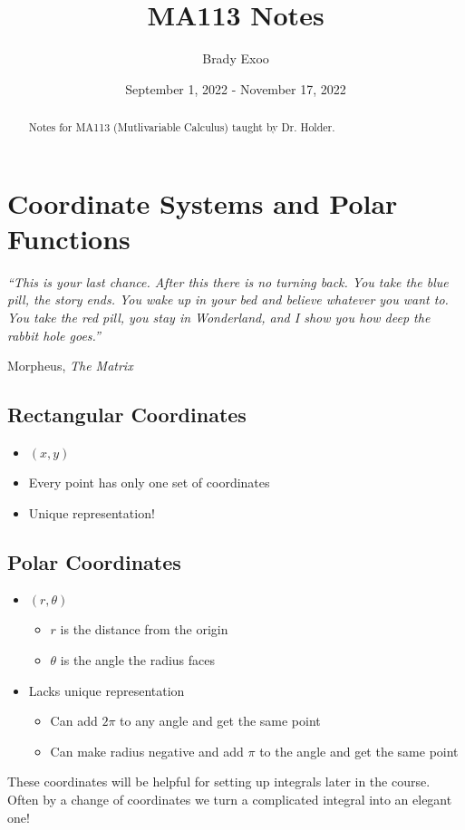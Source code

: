 \documentclass[12pt]{article}
\theoremstyle{plain} %
\theoremstyle{definition}
\theoremstyle{definition}
\theoremstyle{definition}
\theoremstyle{remark}
\begin{document}
\title{MA113 Notes}
\author{Brady Exoo}
\date{September 1, 2022 - November 17, 2022}
\maketitle

\begin{abstract}
Notes for MA113 (Mutlivariable Calculus) taught by Dr. Holder.
\end{abstract}

\tableofcontents

\eject

\section{Coordinate Systems and Polar Functions}
\epigraph{\itshape ``This is your last chance. After this there is no turning back. You take the blue pill, the story ends. You wake up in your bed and believe whatever you want to. You take the red pill, you stay in Wonderland, and I show you how deep the rabbit hole goes.''}{Morpheus, \textit{The Matrix}}

\subsection{Rectangular Coordinates}
\begin{itemize}
    \item $(x,y)$
    \item Every point has only one set of coordinates
    \item Unique representation!
\end{itemize}

\subsection{Polar Coordinates}
\begin{itemize}
    \item $(r,\theta)$
    \begin{itemize}
        \item $r$ is the distance from the origin
        \item $\theta$ is the angle the radius faces
    \end{itemize}
    \item Lacks unique representation
    \begin{itemize}
        \item Can add $2\pi$ to any angle and get the same point
        \item Can make radius negative and add $\pi$ to the angle and get the same point
    \end{itemize}
\end{itemize}
These coordinates will be helpful for setting up integrals later in the course. Often by a change of coordinates we turn a complicated integral into an elegant one!
\end{document}
